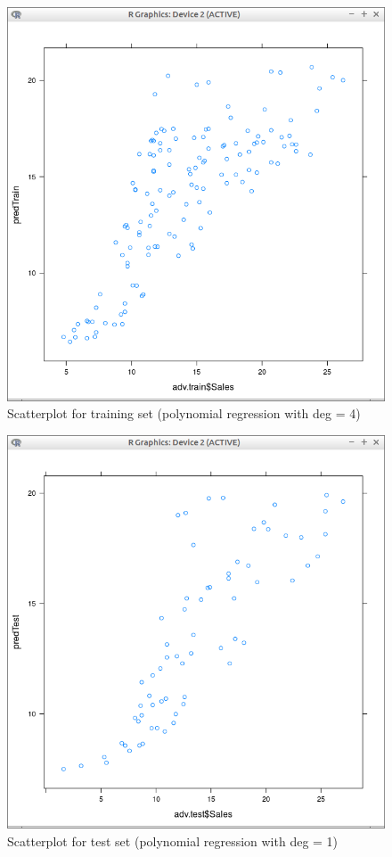 \documentclass[10pt,a4paper]{article}
\begin{document}
\begin{figure}[H]
\centering
\includegraphics[width=140mm]{figures2/pltTr4.png}
\caption{Scatterplot for training set (polynomial regression with deg = 4) \label{overflow}}
\end{figure}

\begin{figure}[H]
\centering
\includegraphics[width=140mm]{figures2/pltTe1.png}
\caption{Scatterplot for test set (polynomial regression with deg = 1) \label{overflow}}
\end{figure}
\end{document}
